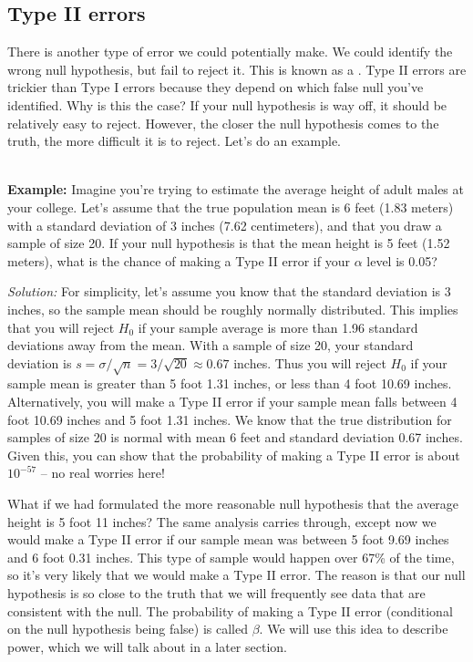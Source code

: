 \subsection{Type II errors}

There is another type of error we could potentially make.  We could identify the wrong null hypothesis, but fail to reject it.  This is known as a . Type II errors are trickier than Type I errors because they depend on which false null you've identified. Why is this the case? If your null hypothesis is way off, it should be relatively easy to reject. However, the closer the null hypothesis comes to the truth, the more difficult it is to reject. Let's do an example.

\ \\

\textbf{Example:} \ex Imagine you're trying to estimate the average height of adult males at your college. Let's assume that the true population mean is 6 feet (1.83 meters) with a standard deviation of 3 inches (7.62 centimeters), and that you draw a sample of size 20. If your null hypothesis is that the mean height is 5 feet (1.52 meters), what is the chance of making a Type II error if your $\alpha$ level is 0.05?

\emph{Solution:} For simplicity, let's assume you know that the standard deviation is 3 inches, so the sample mean should be roughly normally distributed.  This implies that you will reject $H_{0}$ if your sample average is more than 1.96 standard deviations away from the mean. With a sample of size 20, your standard deviation is $s=\sigma/\sqrt{n}=3/\sqrt{20}\approx0.67$ inches. Thus you will reject $H_{0}$ if your sample mean is greater than 5 foot 1.31 inches, or less than 4 foot 10.69 inches. Alternatively,
you will make a Type II error if your sample mean falls between 4 foot 10.69 inches and 5 foot 1.31 inches. We know that the true distribution for samples of size 20 is normal with mean 6 feet and standard deviation 0.67 inches. Given this, you can show that the probability of making a Type II error is about $10^{-57}$ -- no real worries here!

What if we had formulated the more reasonable null hypothesis that the average height is 5 foot 11 inches? The same analysis carries through, except now we would make a Type II error if our sample mean was between 5 foot 9.69 inches and 6 foot 0.31 inches. This type of sample would happen over 67\% of the time, so it's very likely that we would make a Type II error. The reason is that our null hypothesis is so close to the truth that we will frequently see data that are consistent with the null. The probability of making a Type II error (conditional on the null hypothesis being false) is called $\beta$. We will use this idea to describe power, which we will talk about in a later section.




